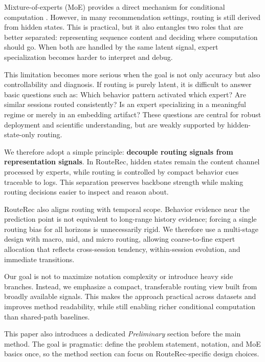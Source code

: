 \documentclass[sigconf,review,anonymous]{acmart}
\begin{document}
Mixture-of-experts (MoE) provides a direct mechanism for conditional computation \cite{jacobs1991adaptive,jordan1994hme,shazeer2017moe,fedus2022switch}. However, in many recommendation settings, routing is still derived from hidden states. This is practical, but it also entangles two roles that are better separated: representing sequence content and deciding where computation should go. When both are handled by the same latent signal, expert specialization becomes harder to interpret and debug.

This limitation becomes more serious when the goal is not only accuracy but also controllability and diagnosis. If routing is purely latent, it is difficult to answer basic questions such as: Which behavior pattern activated which expert? Are similar sessions routed consistently? Is an expert specializing in a meaningful regime or merely in an embedding artifact? These questions are central for robust deployment and scientific understanding, but are weakly supported by hidden-state-only routing.

We therefore adopt a simple principle: \textbf{decouple routing signals from representation signals}. In RouteRec, hidden states remain the content channel processed by experts, while routing is controlled by compact behavior cues traceable to logs. This separation preserves backbone strength while making routing decisions easier to inspect and reason about.

RouteRec also aligns routing with temporal scope. Behavior evidence near the prediction point is not equivalent to long-range history evidence; forcing a single routing bias for all horizons is unnecessarily rigid. We therefore use a multi-stage design with macro, mid, and micro routing, allowing coarse-to-fine expert allocation that reflects cross-session tendency, within-session evolution, and immediate transitions.

Our goal is not to maximize notation complexity or introduce heavy side branches. Instead, we emphasize a compact, transferable routing view built from broadly available signals. This makes the approach practical across datasets and improves method readability, while still enabling richer conditional computation than shared-path baselines.

This paper also introduces a dedicated \textit{Preliminary} section before the main method. The goal is pragmatic: define the problem statement, notation, and MoE basics once, so the method section can focus on RouteRec-specific design choices.
\end{document}
